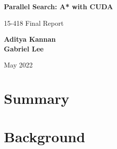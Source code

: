 \documentclass[12pt, oneside]{book}
\begin{document}
\begin{titlepage}
\begin{center}

\vspace*{2cm}

{\Large \textbf{Parallel Search: A* with CUDA}} %

\vspace{5cm}
{15-418 Final Report}

\vspace{2cm}
{\large \textbf{Aditya Kannan}\\ \textbf{Gabriel Lee}}
\vfill

May 2022


\end{center}
\end{titlepage}





\chapter{Summary}


\chapter{Background}

\end{document}
